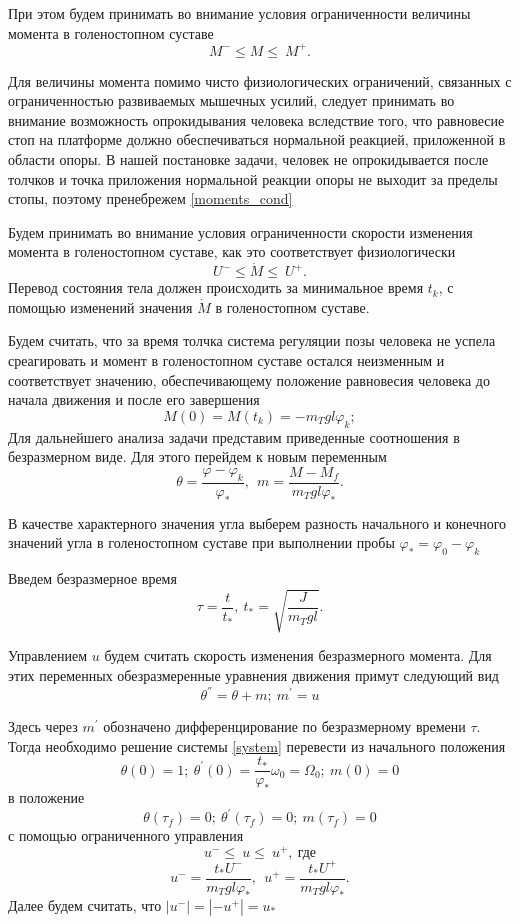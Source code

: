 \documentclass[a4paper,12pt, openany]{book}
\theoremstyle{plain} %
\theoremstyle{definition} %
\theoremstyle{remark} %
\numberwithin{equation}{chapter}
\begin{document}
{При этом будем принимать во внимание
условия ограниченности величины момента в голеностопном суставе
\begin{equation}\label{moments_cond}
    M^-\leqslant M\leqslant\ M^+.
\end{equation}


Для величины момента помимо чисто физиологических ограничений, связанных с ограниченностью развиваемых мышечных усилий, следует принимать во внимание возможность опрокидывания человека вследствие того, что
равновесие стоп на платформе должно обеспечиваться нормальной реакцией, приложенной в области опоры.
В нашей постановке задачи, человек не опрокидывается после толчков и точка приложения нормальной реакции опоры не выходит за пределы стопы, поэтому пренебрежем \eqref{moments_cond}

Будем принимать во внимание условия ограниченности скорости изменения
момента в голеностопном суставе, как это соответствует физиологически
\[
    U^-\leqslant\dot{M}\leqslant\ U^+.
\]
Перевод состояния тела должен происходить за минимальное
время $t_k$, с помощью изменений значения $\dot{M}$ в
голеностопном суставе.

Будем считать, что за время толчка система регуляции позы человека
не успела среагировать и момент в голеностопном суставе остался
неизменным и соответствует значению, обеспечивающему положение
равновесия человека до начала движения и после его завершения
\[
    M(0)=M\left(t_k\right)=-m_Tgl\varphi_k;
\]
Для дальнейшего анализа задачи представим приведенные
соотношения в безразмерном виде. Для этого перейдем
к новым переменным
\[
    \theta=\frac{\varphi-\varphi_k}{\varphi_\ast},\ \ m=\frac{M-M_f}{m_Tgl\varphi_\ast}.
\]

В качестве характерного значения угла выберем разность
начального и конечного значений угла в голеностопном
суставе при выполнении пробы $\varphi_\ast=\varphi_0-\varphi_k$

Введем безразмерное время
\[
    \tau=\frac{t}{t_\ast},\ t_\ast=\sqrt{\frac{J}{m_Tgl}}.
\]

Управлением $u$ будем считать скорость изменения безразмерного
момента. Для этих переменных обезразмеренные уравнения движения
примут следующий вид
\begin{equation}\label{system}
    \theta^{''}=\theta+m;\ m^{'}=u
\end{equation}

Здесь через $m^{'}$ обозначено дифференцирование по
безразмерному времени $\tau$. Тогда необходимо решение системы \eqref{system}
перевести из начального положения
\[
    \theta(0)=1;\ \theta^{'}(0)=\frac{t_\ast}{\varphi_\ast}\omega_0=\Omega_0;\ m(0)=0
\]
в положение
\[
    \theta(\tau_f)=0;\ \theta^{'}(\tau_f)=0;\ m(\tau_f)=0
\]
с помощью ограниченного управления
\[
    u^-\leqslant\ u\leqslant\ u^+,\ \text{где}
\]
\[
    u^-=\frac{t_\ast U^-}{m_Tgl\varphi_\ast },\ \ u^+=\frac{t_\ast U^+}{m_Tgl\varphi_\ast}.
\]
Далее будем считать, что $|u^-|=|-u^+|=u_\ast$

}
\end{document}
